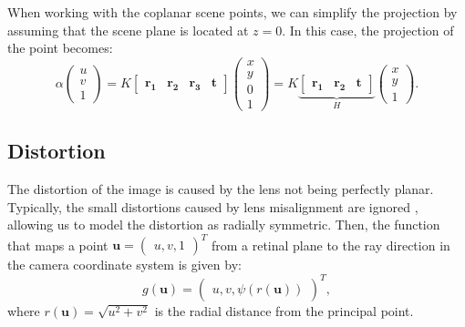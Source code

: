 When working with the coplanar scene points, we can simplify the projection
by assuming that the scene plane is located at \(z = 0\). In this case, the
projection of the point becomes:
\begin{equation}
	\alpha \begin{pmatrix}
		u \\ v \\ 1
	\end{pmatrix} = K \begin{bmatrix}
		\mathbf{r_1} & \mathbf{r_2} & \mathbf{r_3} & \mathbf{t}
	\end{bmatrix} \begin{pmatrix}
		x \\ y \\ 0 \\ 1
	\end{pmatrix} = K \underbrace{\begin{bmatrix}
			\mathbf{r_1} & \mathbf{r_2} & \mathbf{t}
		\end{bmatrix}}_{H} \begin{pmatrix}
		x \\ y \\ 1
	\end{pmatrix}.
\end{equation}

\subsection{Distortion}\label{sub:distortion}

The distortion of the image is caused by the lens not being perfectly planar.
Typically, the small distortions caused by lens misalignment are ignored
\cite{hartleyMultipleViewGeometry2004}, allowing us to model the distortion as radially symmetric.
Then, the function that maps a point \(\mathbf{u} = \begin{pmatrix}
	u, v, 1
\end{pmatrix}^{T}\) from a retinal plane to the
ray direction in the camera coordinate system is given by:
\begin{equation}
	g(\mathbf{u}) = \begin{pmatrix}
		u, v, \psi(r(\mathbf{u}))
	\end{pmatrix}^{T},
\end{equation}
where \(r(\mathbf{u}) = \sqrt{u^2 + v^2}\) is the radial distance from the
principal point.

